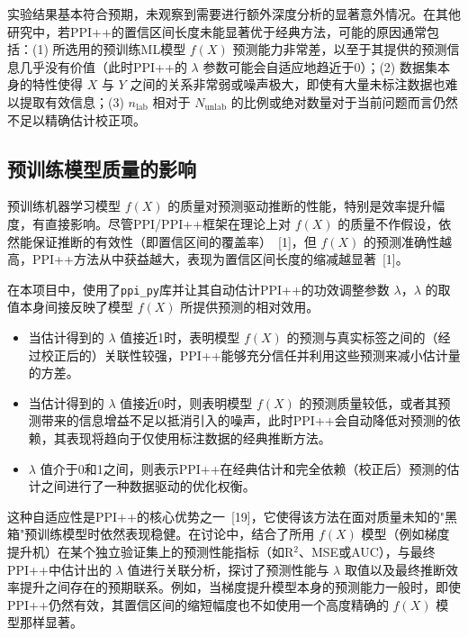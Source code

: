 \documentclass[12pt,a4paper]{article}
\begin{document}
实验结果基本符合预期，未观察到需要进行额外深度分析的显著意外情况。在其他研究中，若PPI++的置信区间长度未能显著优于经典方法，可能的原因通常包括：(1) 所选用的预训练ML模型 $f(X)$ 预测能力非常差，以至于其提供的预测信息几乎没有价值（此时PPI++的 $\lambda$ 参数可能会自适应地趋近于0）；(2) 数据集本身的特性使得 $X$ 与 $Y$ 之间的关系非常弱或噪声极大，即使有大量未标注数据也难以提取有效信息；(3) $n_{\text{lab}}$ 相对于 $N_{\text{unlab}}$ 的比例或绝对数量对于当前问题而言仍然不足以精确估计校正项。

\subsection{预训练模型质量的影响}
\label{sec:model_quality_impact}
预训练机器学习模型 $f(X)$ 的质量对预测驱动推断的性能，特别是效率提升幅度，有直接影响。尽管PPI/PPI++框架在理论上对 $f(X)$ 的质量不作假设，依然能保证推断的有效性（即置信区间的覆盖率）~{[1]}，但 $f(X)$ 的预测准确性越高，PPI++方法从中获益越大，表现为置信区间长度的缩减越显著~{[1]}。

在本项目中，使用了\texttt{ppi\_py}库并让其自动估计PPI++的功效调整参数 $\lambda$，$\lambda$ 的取值本身间接反映了模型 $f(X)$ 所提供预测的相对效用。
\begin{itemize}
    \item 当估计得到的 $\lambda$ 值接近1时，表明模型 $f(X)$ 的预测与真实标签之间的（经过校正后的）关联性较强，PPI++能够充分信任并利用这些预测来减小估计量的方差。
    \item 当估计得到的 $\lambda$ 值接近0时，则表明模型 $f(X)$ 的预测质量较低，或者其预测带来的信息增益不足以抵消引入的噪声，此时PPI++会自动降低对预测的依赖，其表现将趋向于仅使用标注数据的经典推断方法。
    \item $\lambda$ 值介于0和1之间，则表示PPI++在经典估计和完全依赖（校正后）预测的估计之间进行了一种数据驱动的优化权衡。
\end{itemize}
这种自适应性是PPI++的核心优势之一~{[19]}，它使得该方法在面对质量未知的"黑箱"预训练模型时依然表现稳健。在讨论中，结合了所用 $f(X)$ 模型（例如梯度提升机）在某个独立验证集上的预测性能指标（如R$^2$、MSE或AUC），与最终PPI++中估计出的 $\lambda$ 值进行关联分析，探讨了预测性能与 $\lambda$ 取值以及最终推断效率提升之间存在的预期联系。例如，当梯度提升模型本身的预测能力一般时，即使PPI++仍然有效，其置信区间的缩短幅度也不如使用一个高度精确的 $f(X)$ 模型那样显著。
\end{document}
